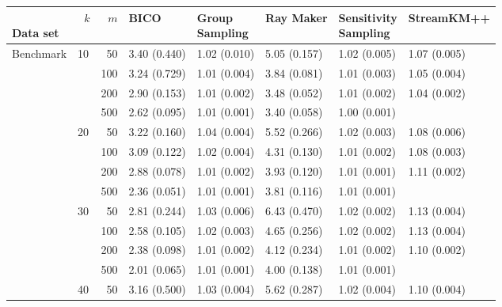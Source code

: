 \begin{longtable}{p{}lrlllll} 
\toprule
\parbox[t]{2cm}{\ \\Data set}  & \parbox[t]{5mm}{\ \\$k$} & \parbox[t]{5mm}{\ \\$m$} &           BICO & \parbox[t]{1cm}{Group\\Sampling} &      Ray Maker & \parbox[t]{1cm}{Sensitivity\\Sampling} &    StreamKM++ \\
\midrule
Benchmark & 10  & 50  &   3.40 (0.440) &   1.02 (0.010) &   5.05 (0.157) &         1.02 (0.005) &  1.07 (0.005) \\
      &     & 100 &   3.24 (0.729) &   1.01 (0.004) &   3.84 (0.081) &         1.01 (0.003) &  1.05 (0.004) \\
      &     & 200 &   2.90 (0.153) &   1.01 (0.002) &   3.48 (0.052) &         1.01 (0.002) &  1.04 (0.002) \\
      &     & 500 &   2.62 (0.095) &   1.01 (0.001) &   3.40 (0.058) &         1.00 (0.001) &            \\
      & 20  & 50  &   3.22 (0.160) &   1.04 (0.004) &   5.52 (0.266) &         1.02 (0.003) &  1.08 (0.006) \\
      &     & 100 &   3.09 (0.122) &   1.02 (0.004) &   4.31 (0.130) &         1.01 (0.002) &  1.08 (0.003) \\
      &     & 200 &   2.88 (0.078) &   1.01 (0.002) &   3.93 (0.120) &         1.01 (0.001) &  1.11 (0.002) \\
      &     & 500 &   2.36 (0.051) &   1.01 (0.001) &   3.81 (0.116) &         1.01 (0.001) &            \\
      & 30  & 50  &   2.81 (0.244) &   1.03 (0.006) &   6.43 (0.470) &         1.02 (0.002) &  1.13 (0.004) \\
      &     & 100 &   2.58 (0.105) &   1.02 (0.003) &   4.65 (0.256) &         1.02 (0.002) &  1.13 (0.004) \\
      &     & 200 &   2.38 (0.098) &   1.01 (0.002) &   4.12 (0.234) &         1.01 (0.002) &  1.10 (0.002) \\
      &     & 500 &   2.01 (0.065) &   1.01 (0.001) &   4.00 (0.138) &         1.01 (0.001) &            \\
      & 40  & 50  &   3.16 (0.500) &   1.03 (0.004) &   5.62 (0.287) &         1.02 (0.004) &  1.10 (0.004) \\

\end{longtable}
